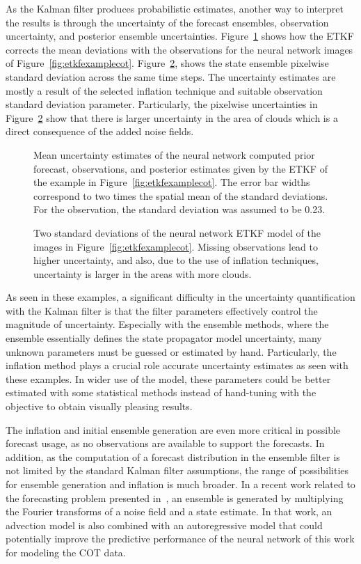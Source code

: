 As the Kalman filter produces probabilistic estimates, another way to interpret the results is through the uncertainty of the forecast ensembles, observation uncertainty, and posterior ensemble uncertainties.
Figure~\ref{fig:etkferrorbars} shows how the ETKF corrects the mean deviations with the observations for the neural network images of Figure~\ref{fig:etkfexamplecot}.
Figure~\ref{fig:etkfstd}, shows the state ensemble pixelwise standard deviation across the same time steps.
The uncertainty estimates are mostly a result of the selected inflation technique and suitable observation standard deviation parameter.
Particularly, the pixelwise uncertainties in Figure~\ref{fig:etkfstd} show that there is larger uncertainty in the area of clouds which is a direct consequence of the added noise fields.

\begin{figure}[h]
    \caption{\label{fig:etkferrorbars}Mean uncertainty estimates of the neural network computed prior forecast, observations, and posterior estimates given by the ETKF of the example in Figure~\ref{fig:etkfexamplecot}.
        The error bar widths correspond to two times the spatial mean of the standard deviations.
    For the observation, the standard deviation was assumed to be 0.23.}
\end{figure}

\begin{figure}[h]
    \caption{\label{fig:etkfstd}Two standard deviations of the neural network ETKF model of the images in Figure~\ref{fig:etkfexamplecot}.
    Missing observations lead to higher uncertainty, and also, due to the use of inflation techniques, uncertainty is larger in the areas with more clouds.}
\end{figure}

As seen in these examples, a significant difficulty in the uncertainty quantification with the Kalman filter is that the filter parameters effectively control the magnitude of uncertainty.
Especially with the ensemble methods, where the ensemble essentially defines the state propagator model uncertainty, many unknown parameters must be guessed or estimated by hand.
Particularly, the inflation method plays a crucial role accurate uncertainty estimates as seen with these examples.
In wider use of the model, these parameters could be better estimated with some statistical methods instead of hand-tuning with the objective to obtain visually pleasing results.

The inflation and initial ensemble generation are even more critical in possible forecast usage, as no observations are available to support the forecasts.
In addition, as the computation of a forecast distribution in the ensemble filter is not limited by the standard Kalman filter assumptions, the range of possibilities for ensemble generation and inflation is much broader.
In a recent work related to the forecasting problem presented in~\cite{intraday}, an ensemble is generated by multiplying the Fourier transforms of a noise field and a state estimate.
In that work, an advection model is also combined with an autoregressive model that could potentially improve the predictive performance of the neural network of this work for modeling the COT data.

